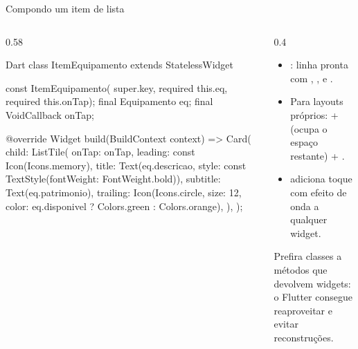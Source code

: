 \documentclass[aspectratio=169,10pt]{beamer}
\begin{document}
\begin{frame}[fragile]{Compondo um item de lista}
  \begin{columns}[T]
    \begin{column}{0.58\textwidth}
\begin{codigo}[title=item\_equipamento.dart]{Dart}
class ItemEquipamento extends StatelessWidget {
  const ItemEquipamento(
      {super.key, required this.eq, required this.onTap});
  final Equipamento eq;
  final VoidCallback onTap;

  @override
  Widget build(BuildContext context) => Card(
    child: ListTile(
      onTap: onTap,
      leading: const Icon(Icons.memory),
      title: Text(eq.descricao,
          style: const TextStyle(fontWeight: FontWeight.bold)),
      subtitle: Text(eq.patrimonio),
      trailing: Icon(Icons.circle, size: 12,
          color: eq.disponivel ? Colors.green : Colors.orange),
    ),
  );
}
\end{codigo}
    \end{column}
    \begin{column}{0.4\textwidth}
      \small
      \begin{itemize}
        \item {}: linha pronta com , ,  e .
        \item Para layouts próprios:  +  (ocupa o espaço restante) + .
        \item {} adiciona toque com efeito de onda a qualquer widget.
      \end{itemize}
      \begin{dica}
        Prefira classes  a métodos que devolvem widgets: o Flutter consegue reaproveitar e evitar reconstruções.
      \end{dica}
    \end{column}
  \end{columns}
\end{frame}
\end{document}
